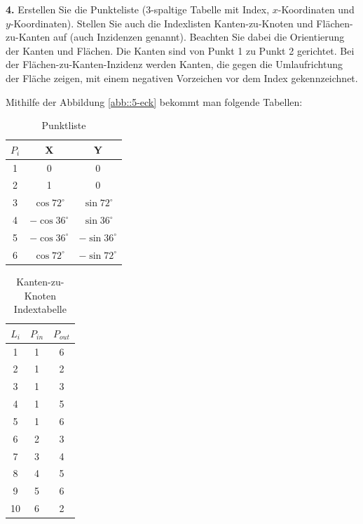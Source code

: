 \documentclass[Protokollheft.tex]{subfiles}
\begin{document}
        \begin{framed}
	\noindent \textbf{4.} Erstellen Sie die Punkteliste (3-spaltige Tabelle mit Index, $x$-Koordinaten und $y$-Koordinaten). Stellen Sie auch die Indexlisten Kanten-zu-Knoten und Flächen-zu-Kanten auf (auch Inzidenzen genannt).
                    Beachten Sie dabei die Orientierung der Kanten und Flächen. Die Kanten sind von Punkt 1
                    zu Punkt 2 gerichtet. Bei der Flächen-zu-Kanten-Inzidenz werden Kanten, die gegen die
                    Umlaufrichtung der Fläche zeigen, mit einem negativen Vorzeichen vor dem Index gekennzeichnet.\label{exer:incidences}
\end{framed}
Mithilfe der Abbildung \ref{abb::5-eck} bekommt man folgende Tabellen:
\begin{table}[h!]
	\begin{center}
	
	\label{tab:table1}
	\begin{tabular}{c|c|c} %
		$P_i$ & X & Y\\
		\hline
		1 & 0 & 0\\
		2 & 1 & 0\\
		3 & $\cos 72^\circ$ &$\sin 72^\circ$ \\
		4 & $-\cos 36^\circ$ &$\sin 36^\circ$ \\
		5 & $-\cos 36^\circ$ &$-\sin 36^\circ$ \\
		6 & $\cos 72^\circ$ &$-\sin 72^\circ$ \\
	\end{tabular}
	\end{center}
\caption{Punktliste}

\end{table}
\begin{table}[h!]
	\begin{center}
	
		
		\begin{tabular}{c|c|c} %
			$L_i$ & $P_{in}$ & $P_{out}$\\
			\hline
			1 & 1 & 6\\
			2 & 1 & 2\\
			3 & 1 & 3\\
			4 & 1 & 5\\
			5 & 1 & 6\\
			6 & 2 & 3\\
			7 & 3 & 4\\
			8 & 4 & 5\\
			9 & 5 & 6\\
			10 & 6 & 2\\  
		\end{tabular}
			\end{center}
		\caption{Kanten-zu-Knoten Indextabelle}
	\label{tab:table2}
\end{table}
\end{document}
